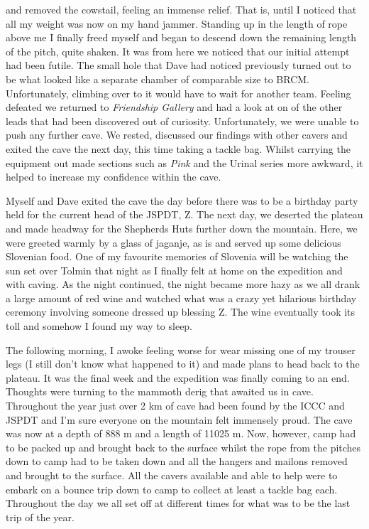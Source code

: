 and removed the cowstail, feeling an immense relief. That is, until I
noticed that all my weight was now on my hand jammer. Standing up in the
length of rope above me I finally freed myself and began to descend down
the remaining length of the pitch, quite shaken. It was from here we
noticed that our initial attempt had been futile. The small hole that
Dave had noticed previously turned out to be what looked like a separate
chamber of comparable size to BRCM. Unfortunately, climbing over to it
would have to wait for another team. Feeling defeated we returned to
\emph{Friendship Gallery} and had a look at on of the other leads that
had been discovered out of curiosity. Unfortunately, we were unable to
push any further cave. We rested, discussed our findings with other
cavers and exited the cave the next day, this time taking a tackle bag.
Whilst carrying the equipment out made sections such as \emph{Pink} and
the Urinal series more awkward, it helped to increase my confidence
within the cave.

Myself and Dave exited the cave the day before there was to be a
birthday party held for the current head of the JSPDT, Z. The next day,
we deserted the plateau and made headway for the Shepherds Huts further
down the mountain. Here, we were greeted warmly by a glass of jaganje,
as is and served up some delicious Slovenian food. One of my favourite
memories of Slovenia will be watching the sun set over Tolmin that night
as I finally felt at home on the expedition and with caving. As the
night continued, the night became more hazy as we all drank a large
amount of red wine and watched what was a crazy yet hilarious birthday
ceremony involving someone dressed up blessing Z. The wine eventually
took its toll and somehow I found my way to sleep.

The following morning, I awoke feeling worse for wear missing one of my
trouser legs (I still don't know what happened to it) and made plans to
head back to the plateau. It was the final week and the expedition was
finally coming to an end. Thoughts were turning to the mammoth derig
that awaited us in cave. Throughout the year just over 2 km of cave had
been found by the ICCC and JSPDT and I'm sure everyone on the mountain
felt immensely proud. The cave was now at a depth of 888 m and a length
of 11025 m. Now, however, camp had to be packed up and brought back to
the surface whilst the rope from the pitches down to camp had to be
taken down and all the hangers and mailons removed and brought to the
surface. All the cavers available and able to help were to embark on a
bounce trip down to camp to collect at least a tackle bag each.
Throughout the day we all set off at different times for what was to be
the last trip of the year.

